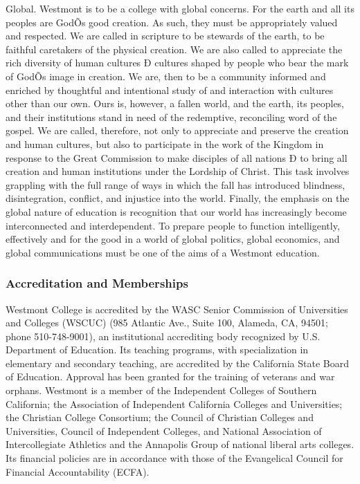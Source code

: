 \documentclass[letterpaper, 11pt]{article}
\begin{document}
   Global.  Westmont is to be a college with global concerns.  For the earth and all its peoples are GodÕs good creation.  As such, they must be appropriately valued and respected.  We are called in scripture to be stewards of the earth, to be faithful caretakers of the physical creation.  We are also called to appreciate the rich diversity of human cultures Ð cultures shaped by people who bear the mark of GodÕs image in creation.  We are, then to be a community informed and enriched by thoughtful and intentional study of and interaction with cultures other than our own.  Ours is, however, a fallen world, and the earth, its peoples, and their institutions stand in need of the redemptive, reconciling word of the gospel.  We are called, therefore, not only to appreciate and preserve the creation and human cultures, but also to participate in the work of the Kingdom in response to the Great Commission to make disciples of all nations Ð to bring all creation and human institutions under the Lordship of Christ.  This task involves grappling with the full range of ways in which the fall has introduced blindness, disintegration, conflict, and injustice into the world.  Finally, the emphasis on the global nature of education is recognition that our world has increasingly become interconnected and interdependent.  To prepare people to function intelligently, effectively and for the good in a world of global politics, global economics, and global communications must be one of the aims of a Westmont education.
\subsubsection{Accreditation and Memberships}
   Westmont College is accredited by the WASC Senior Commission of Universities and Colleges (WSCUC) (985 Atlantic Ave., Suite 100, Alameda, CA, 94501; phone 510-748-9001), an institutional accrediting body recognized by U.S. Department of Education.  Its teaching programs, with specialization in elementary and secondary teaching, are accredited by the California State Board of Education. Approval has been granted for the training of veterans and war orphans.
   Westmont is a member of the Independent Colleges of Southern California; the Association of Independent California Colleges and Universities; the Christian College Consortium; the Council of Christian Colleges and Universities, Council of Independent Colleges, and National Association of Intercollegiate Athletics and the Annapolis Group of national liberal arts colleges.  Its financial policies are in accordance with those of the Evangelical Council for Financial Accountability (ECFA).
\end{document}
